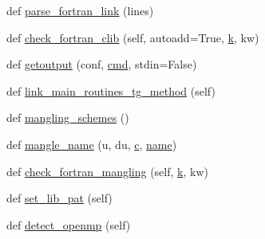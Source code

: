 \begin{DoxyCompactItemize}
\item 
def \hyperlink{namespacewaflib_1_1_tools_1_1fc__config_a643b036f881429dd3242675b282f853b}{parse\+\_\+fortran\+\_\+link} (lines)
\item 
def \hyperlink{namespacewaflib_1_1_tools_1_1fc__config_af4d3637a02c4f282d2005bc1cd87af6d}{check\+\_\+fortran\+\_\+clib} (self, autoadd=True, \hyperlink{rfft2d_test_m_l_8m_adc468c70fb574ebd07287b38d0d0676d}{k}, kw)
\item 
def \hyperlink{namespacewaflib_1_1_tools_1_1fc__config_a41ccbf12d86d6c945a6b8f4d598ab479}{getoutput} (conf, \hyperlink{sndfile__play_8m_adfc5ba7e22f5e4a6221c12a70503bef3}{cmd}, stdin=False)
\item 
def \hyperlink{namespacewaflib_1_1_tools_1_1fc__config_a046b800b80c2dcaa4c5ff10008814306}{link\+\_\+main\+\_\+routines\+\_\+tg\+\_\+method} (self)
\item 
def \hyperlink{namespacewaflib_1_1_tools_1_1fc__config_a851a07c412fad1fcfa59fd409981d936}{mangling\+\_\+schemes} ()
\item 
def \hyperlink{namespacewaflib_1_1_tools_1_1fc__config_ab08a4a190abfce7dc697bbfbfe6c5287}{mangle\+\_\+name} (u, du, \hyperlink{rfft2d_test_m_l_8m_ae0323a9039add2978bf5b49550572c7c}{c}, \hyperlink{lib_2expat_8h_a1b49b495b59f9e73205b69ad1a2965b0}{name})
\item 
def \hyperlink{namespacewaflib_1_1_tools_1_1fc__config_a6063b8d4b97d234df1b3c357918c07ae}{check\+\_\+fortran\+\_\+mangling} (self, \hyperlink{rfft2d_test_m_l_8m_adc468c70fb574ebd07287b38d0d0676d}{k}, kw)
\item 
def \hyperlink{namespacewaflib_1_1_tools_1_1fc__config_a5def4858c602d4c57dfc3aefe771e8b6}{set\+\_\+lib\+\_\+pat} (self)
\item 
def \hyperlink{namespacewaflib_1_1_tools_1_1fc__config_adebe873fd211b7a010ce5167e718f917}{detect\+\_\+openmp} (self)
\end{DoxyCompactItemize}
